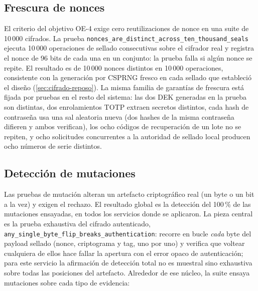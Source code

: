 \subsection{Frescura de nonces}\label{sec:pruebas-nonces}

El criterio del objetivo OE-4 exige cero reutilizaciones de nonce en una suite de 10\,000 cifrados. La prueba \texttt{nonces\_are\_distinct\_across\_ten\_thousand\_seals} ejecuta 10\,000 operaciones de sellado consecutivas sobre el cifrador real y registra el nonce de 96 bits de cada una en un conjunto: la prueba falla si algún nonce se repite. El resultado es de 10\,000 nonces distintos en 10\,000 operaciones, consistente con la generación por CSPRNG fresco en cada sellado que estableció el diseño (\cref{sec:cifrado-reposo}). La misma familia de garantías de frescura está fijada por pruebas en el resto del sistema: las dos DEK generadas en la prueba son distintas, dos enrolamientos TOTP extraen secretos distintos, cada hash de contraseña usa una sal aleatoria nueva (dos hashes de la misma contraseña difieren y ambos verifican), los ocho códigos de recuperación de un lote no se repiten, y ocho solicitudes concurrentes a la autoridad de sellado local producen ocho números de serie distintos.

\subsection{Detección de mutaciones}\label{sec:pruebas-mutacion}

Las pruebas de mutación alteran un artefacto criptográfico real (un byte o un bit a la vez) y exigen el rechazo. El resultado global es la detección del 100\,\% de las mutaciones ensayadas, en todos los servicios donde se aplicaron. La pieza central es la prueba exhaustiva del cifrado autenticado, \texttt{any\_single\_byte\_flip\_breaks\_authentication}: recorre en bucle \emph{cada} byte del payload sellado (nonce, criptograma y tag, uno por uno) y verifica que voltear cualquiera de ellos hace fallar la apertura con el error opaco de autenticación; para este servicio la afirmación de detección total no es muestral sino exhaustiva sobre todas las posiciones del artefacto. Alrededor de ese núcleo, la suite ensaya mutaciones sobre cada tipo de evidencia:

